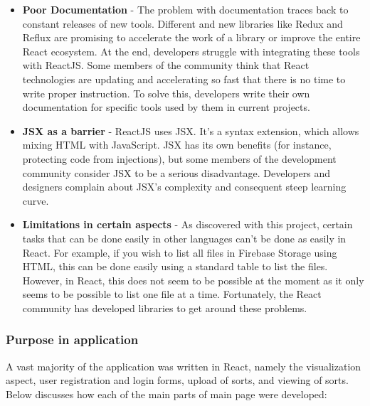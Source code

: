 \begin{itemize}
    \item \textbf{Poor Documentation} - The problem with documentation traces back to constant releases of new tools. Different and new libraries like Redux and Reflux are promising to accelerate the work of a library or improve the entire React ecosystem. At the end, developers struggle with integrating these tools with ReactJS. Some members of the community think that React technologies are updating and accelerating so fast that there is no time to write proper instruction. To solve this, developers write their own documentation for specific tools used by them in current projects.
    \item \textbf{JSX as a barrier} - ReactJS uses JSX. It’s a syntax extension, which allows mixing HTML with JavaScript. JSX has its own benefits (for instance, protecting code from injections), but some members of the development community consider JSX to be a serious disadvantage. Developers and designers complain about JSX’s complexity and consequent steep learning curve.
    \item \textbf{Limitations in certain aspects} - As discovered with this project, certain tasks that can be done easily in other languages can't be done as easily in React. For example, if you wish to list all files in Firebase Storage using HTML, this can be done easily using a standard table to list the files. However, in React, this does not seem to be possible at the moment as it only seems to be possible to list one file at a time. Fortunately, the React community has developed libraries to get around these problems.
\end{itemize}

\newpage
\subsubsection{Purpose in application}
A vast majority of the application was written in React, namely the visualization aspect, user registration and login forms, upload of sorts, and viewing of sorts. Below discusses how each of the main parts of main page were developed:
\par
\bigskip

